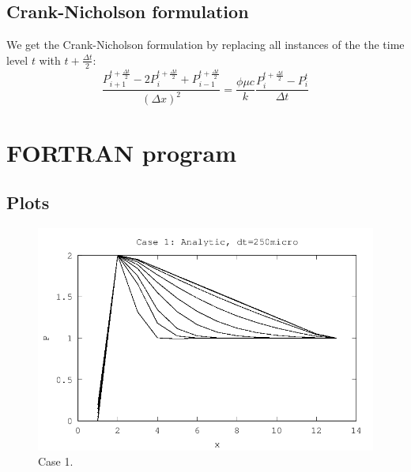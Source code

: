 \subsection{Crank-Nicholson formulation} %
\label{sub:crank_nicholson_formulation}
We get the Crank-Nicholson formulation by replacing all instances of the the time level $t$ with $t + \frac{\Delta t}{2}$:
\begin{equation}
  \frac{P_{i+1}^{t + \frac{\Delta t}{2}} - 2P_i^{t + \frac{\Delta t}{2}} + P_{i-1}^{t + \frac{\Delta t}{2}}}{(\Delta x)^2} = \frac{\phi \mu c}{k} \frac{P_i^{t + \frac{\Delta t}{2}} - P_i^t}{\Delta t}
  \label{eq:crank_nicholson_formulation}
\end{equation}


\pagebreak


\section{FORTRAN program} %
\label{sec:fortran_program}

\subsection{Plots} %
\label{sub:plots}

\begin{figure}[H]
  \centering
  \includegraphics[]{../code/case1.png}
  \caption{Case 1.}
  \label{fig:case1}
\end{figure}

